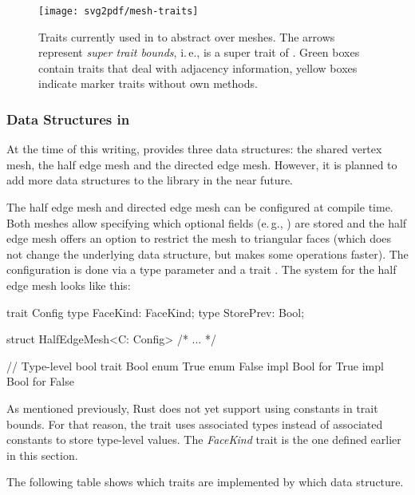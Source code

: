 \begin{figure}[th]
  \centering
  \texttt{[image: svg2pdf/mesh-traits]}
  \caption{
    Traits currently used in  to abstract over meshes.
    The arrows represent \emph{super trait bounds}, i.\,e.,  is a super trait of .
    Green boxes contain traits that deal with adjacency information, yellow boxes indicate marker traits without own methods.
  }
  \label{fig:mesh-traits}
\end{figure}


\vfill
\subsubsection*{Data Structures in }

At the time of this writing,  provides three data structures:
the shared vertex mesh, the half edge mesh and the directed edge mesh.
However, it is planned to add more data structures to the library in the near future.

The half edge mesh and directed edge mesh can be configured at compile time.
Both meshes allow specifying which optional fields (e.\,g., ) are stored and the half edge mesh offers an option to restrict the mesh to triangular faces (which does not change the underlying data structure, but makes some operations faster).
The configuration is done via a type parameter and a trait .
The system for the half edge mesh looks like this:

\begin{rustcode}
trait Config {
    type FaceKind: FaceKind;
    type StorePrev: Bool;
}

struct HalfEdgeMesh<C: Config> { /* ... */ }

// Type-level bool
trait Bool {}
enum True {}
enum False {}
impl Bool for True {}
impl Bool for False {}
\end{rustcode}

As mentioned previously, Rust does not yet support using constants in trait bounds.
For that reason, the  trait uses associated types instead of associated constants to store type-level values.
The \emph{FaceKind} trait is the one defined earlier in this section.

\newpage
The following table shows which traits are implemented by which data structure.

